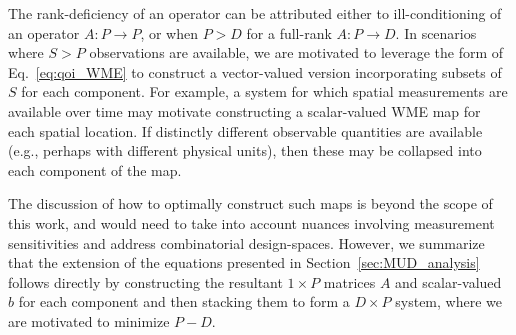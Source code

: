 The rank-deficiency of an operator can be attributed either to ill-conditioning of an operator $A:P\to P$, or when $P>D$ for a full-rank $A:P\to D$.
In scenarios where $S>P$ observations are available, we are motivated to leverage the form of Eq.~\eqref{eq:qoi_WME} to construct a vector-valued version incorporating subsets of $S$ for each component.
For example, a system for which spatial measurements are available over time may motivate constructing a scalar-valued WME map for each spatial location.
If distinctly different observable quantities are available (e.g., perhaps with different physical units), then these may be collapsed into each component of the map.

The discussion of how to optimally construct such maps is beyond the scope of this work, and would need to take into account nuances involving measurement sensitivities and address combinatorial design-spaces.
However, we summarize that the extension of the equations presented in Section~\ref{sec:MUD_analysis} follows directly by constructing the resultant $1\times P$ matrices $A$ and scalar-valued $b$ for each component and then stacking them to form a $D\times P$ system, where we are motivated to minimize $P-D$.


